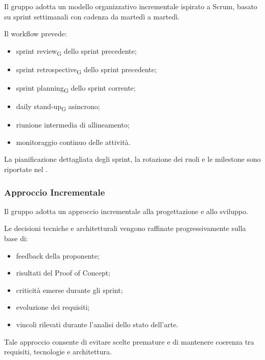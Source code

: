 Il gruppo adotta un modello organizzativo incrementale ispirato a Scrum,
basato su sprint settimanali con cadenza da martedì a martedì.

Il workflow prevede:

\begin{itemize}
    \item sprint review\textsubscript{G} dello sprint precedente;
    \item sprint retrospective\textsubscript{G} dello sprint precedente;
    \item sprint planning\textsubscript{G} dello sprint corrente;
    \item daily stand-up\textsubscript{G} asincrono;
    \item riunione intermedia di allineamento;
    \item monitoraggio continuo delle attività.
\end{itemize}

La pianificazione dettagliata degli sprint, la rotazione dei ruoli e le milestone
sono riportate nel .


\subsubsection{Approccio Incrementale}

Il gruppo adotta un approccio incrementale alla progettazione e allo sviluppo.

Le decisioni tecniche e architetturali vengono raffinate progressivamente sulla base di:

\begin{itemize}
    \item feedback della proponente;
    \item risultati del Proof of Concept;
    \item criticità emerse durante gli sprint;
    \item evoluzione dei requisiti;
    \item vincoli rilevati durante l'analisi dello stato dell'arte.
\end{itemize}

Tale approccio consente di evitare scelte premature e di mantenere coerenza tra
requisiti, tecnologie e architettura.

